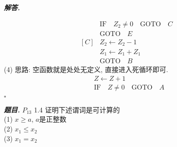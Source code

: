 \documentclass[10pt, a4paper, oneside]{ctexart}
\newenvironment{problem}{\begin{framed}\par\noindent\textbf{\textit{题目. }}}{\end{framed}\par}
\newenvironment{solution}{%
  \par\noindent\textbf{\textit{解答. }}\ignorespaces
}{%
  \hfill\ensuremath{\square}\par
}
\begin{document}
\begin{solution}
\begin{align*}
    [B]& \text{IF} \quad Z_2\neq 0 \quad \text{GOTO} \quad C\\
    &\text{GOTO}\quad  E\\
    [C]& Z_2\leftarrow Z_2-1\\
    &Z_1\leftarrow Z_1+Z_1\\
    &\text{GOTO}\quad  B
\end{align*}
(4) 思路: 空函数就是处处无定义, 直接进入死循环即可.
\begin{align*}
    [A]&Z\leftarrow Z+1\\
    & \text{IF} \quad Z\neq 0 \quad \text{GOTO} \quad A\\
\end{align*}
\end{solution}

\begin{problem}
    $P_{13}$ 1.4 证明下述谓词是可计算的\\
(1) $x\geq a$, $a$是正整数\\
(2) $x_1\leq x_2$\\
(3) $x_1=x_2$
\end{problem}
\end{document}
